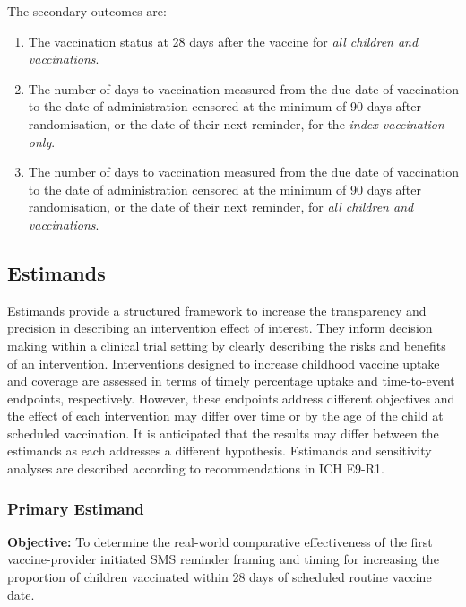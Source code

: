 \documentclass[
  bibliography=totoc]{scrreprt}
\providecommand{\tightlist}{%
  \setlength{\itemsep}{0pt}\setlength{\parskip}{0pt}}
\begin{document}
The secondary outcomes are:

\begin{enumerate}
\def\labelenumi{\arabic{enumi}.}
\tightlist
\item
  The vaccination status at 28 days after the vaccine for \emph{all children and vaccinations}.
\item
  The number of days to vaccination measured from the due date of vaccination to the date of administration censored at the minimum of 90 days after randomisation, or the date of their next reminder, for the \emph{index vaccination only}.
\item
  The number of days to vaccination measured from the due date of vaccination to the date of administration censored at the minimum of 90 days after randomisation, or the date of their next reminder, for \emph{all children and vaccinations}.
\end{enumerate}

\hypertarget{estimands}{%
\subsection{Estimands}\label{estimands}}

Estimands provide a structured framework to increase the transparency and precision in describing an intervention effect of interest.
They inform decision making within a clinical trial setting by clearly describing the risks and benefits of an intervention.
Interventions designed to increase childhood vaccine uptake and coverage are assessed in terms of timely percentage uptake and time-to-event endpoints, respectively.
However, these endpoints address different objectives and the effect of each intervention may differ over time or by the age of the child at scheduled vaccination.
It is anticipated that the results may differ between the estimands as each addresses a different hypothesis.
Estimands and sensitivity analyses are described according to recommendations in ICH E9-R1.

\hypertarget{primary-estimand}{%
\subsubsection{Primary Estimand}\label{primary-estimand}}

\textbf{Objective:} To determine the real-world comparative effectiveness of the first vaccine-provider initiated SMS reminder framing and timing for increasing the proportion of children vaccinated within 28 days of scheduled routine vaccine date.
\end{document}
